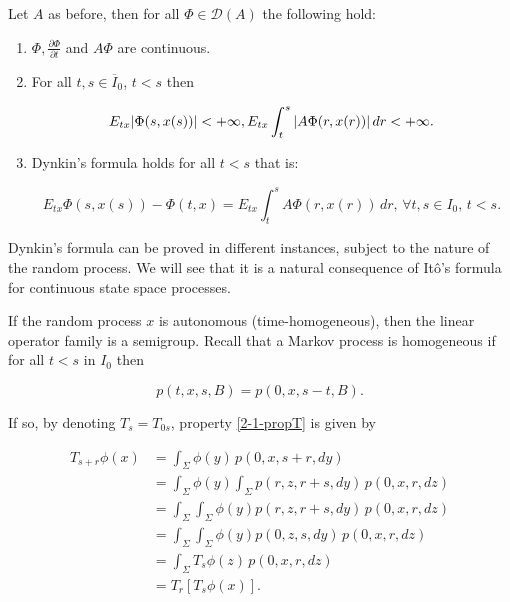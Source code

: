 \begin{proposition}
    Let $A$ as before, then for all $\Phi\in\mathcal{D}(A)$ the following hold:

    \begin{enumerate}
        \item $\Phi,\frac{\partial\Phi}{\partial t}$ and $A\Phi$ are continuous.
        \item For all $t,s\in\overline{I}_0$, $t<s$ then
        
        \[E_{tx}\abs{\Phi(s,x(s))}< +\infty,E_{tx}\int_t^s\abs{A\Phi(r,x(r))}\,dr < +\infty.\]
        
        \item Dynkin's formula holds for all $t<s$ that is:
        
        \begin{equation}\label{2-1-dynkform}
            E_{tx}\Phi(s,x(s)) - \Phi(t,x) = E_{tx}\int_t^s A\Phi(r,x(r)) \,dr,\,\forall t,s\in I_0,\, t<s.
        \end{equation}
    \end{enumerate}


\end{proposition}

Dynkin's formula can be proved in different instances, subject to the nature of the random process. We will see 
that it is a natural consequence of It\^o's formula for continuous state space processes.

If the random process $x$ is autonomous (time-homogeneous), then the linear operator family is a 
semigroup. Recall that a Markov process is homogeneous if for all $t<s$ in $I_0$ then

\[p(t,x,s,B) = p(0,x,s-t,B).\]

If so, by denoting $T_s=T_{0s}$, property \eqref{2-1-propT} is given by

\begin{align*}
    T_{s+r}\phi(x) & = \int_{\Sigma} \phi(y)\,p(0,x,s+r,dy) \\
    & = \int_{\Sigma}\phi(y)\int_{\Sigma} p(r,z,r+s,dy)\,p(0,x,r,dz) \\
    & = \int_{\Sigma}\int_{\Sigma} \phi(y) p(r,z,r+s,dy)\,p(0,x,r,dz) \\
    & = \int_{\Sigma}\int_{\Sigma} \phi(y) p(0,z,s,dy)\,p(0,x,r,dz) \\
    & = \int_{\Sigma} T_{s}\phi(z) \,p(0,x,r,dz) \\
    & = T_r\left[T_s\phi(x)\right].
\end{align*}

